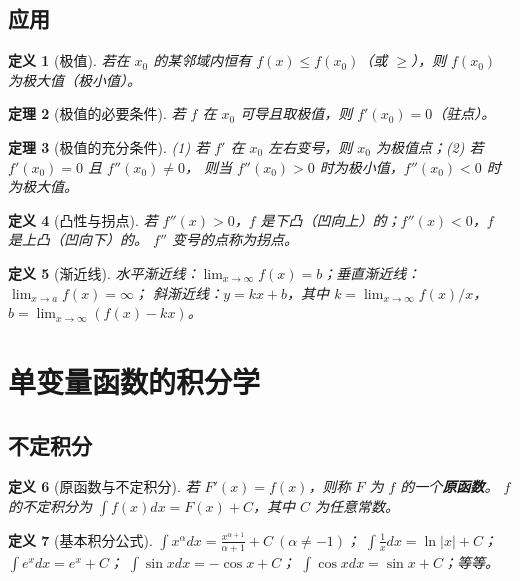 \documentclass[12pt,a4paper]{ctexart}
\newtheorem{theorem}{定理}[section]
\newtheorem{definition}[theorem]{定义}
\theoremstyle{remark}
\begin{document}
\subsection{应用}

\begin{definition}[极值]
若在 $x_0$ 的某邻域内恒有 $f(x) \le f(x_0)$（或 $\ge$），则 $f(x_0)$ 为极大值（极小值）。
\end{definition}

\begin{theorem}[极值的必要条件]
若 $f$ 在 $x_0$ 可导且取极值，则 $f'(x_0) = 0$（驻点）。
\end{theorem}

\begin{theorem}[极值的充分条件]
(1) 若 $f'$ 在 $x_0$ 左右变号，则 $x_0$ 为极值点；(2) 若 $f'(x_0)=0$ 且 $f''(x_0) \neq 0$，
则当 $f''(x_0) > 0$ 时为极小值，$f''(x_0) < 0$ 时为极大值。
\end{theorem}

\begin{definition}[凸性与拐点]
若 $f''(x) > 0$，$f$ 是下凸（凹向上）的；$f''(x) < 0$，$f$ 是上凸（凹向下）的。
$f''$ 变号的点称为拐点。
\end{definition}

\begin{definition}[渐近线]
水平渐近线：$\lim_{x\to\infty} f(x) = b$；垂直渐近线：$\lim_{x\to a} f(x) = \infty$；
斜渐近线：$y = kx + b$，其中 $k = \lim_{x\to\infty} f(x)/x$，$b = \lim_{x\to\infty}(f(x)-kx)$。
\end{definition}

\section{单变量函数的积分学}

\subsection{不定积分}

\begin{definition}[原函数与不定积分]
若 $F'(x) = f(x)$，则称 $F$ 为 $f$ 的一个\textbf{原函数}。
$f$ 的不定积分为 $\int f(x) dx = F(x) + C$，其中 $C$ 为任意常数。
\end{definition}

\begin{definition}[基本积分公式]
$\int x^\alpha dx = \frac{x^{\alpha+1}}{\alpha+1}+C\ (\alpha\neq -1)$；
$\int \frac{1}{x} dx = \ln|x| + C$；
$\int e^x dx = e^x + C$；
$\int \sin x dx = -\cos x + C$；
$\int \cos x dx = \sin x + C$；等等。
\end{definition}
\end{document}
